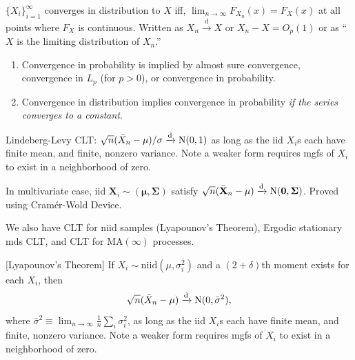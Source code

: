 \documentclass[8pt,letterpaper, landscape]{extarticle} %
\newcommand{\mX}{\ensuremath{\mathbf{X}}}
\newcommand{\mmu}{\ensuremath{\mathbf{\mu}}}
\newcommand{\mSigma}{\ensuremath{\mathbf{\Sigma}}}
\newcommand{\mzero}{\ensuremath{\mathbf{0}}}
\begin{document}
\begin{multicols}{3}
\begin{description}
 $ \{ X_i \}_{i=1}^{\infty} $ converges in distribution to $ X $ iff, $ \lim_{n \to \infty} F_{X_n} (x) = F_X (x) $ at all points where $ F_X $ is continuous. Written as $ X_n \xrightarrow{\text{d}} X $ or $ X_n - X = O_p (1) $ or as ``$ X $ is the limiting distribution of $ X_n $.''
\begin{enumerate}
\item Convergence in probability is implied by almost sure convergence, convergence in $ L_p $ (for $ p>0 $), or convergence in probability.
\item Convergence in distribution implies convergence in probability \textit{if the series converges to a constant}.
\end{enumerate}

 Lindeberg-Levy CLT: $ \sqrt{n} (\bar{X}_n - \mu ) / \sigma \xrightarrow{\text{d}} \operatorname{N} (0,1) $ as long as the iid $ X_i $s each have finite mean, and finite, nonzero variance. Note a weaker form requires mgfs of $ X_i $ to exist in a neighborhood of zero.

In multivariate case, iid $ \mX_i \sim (\mmu, \mSigma) $ satisfy $ \sqrt{n} (\bar{\mX}_n - \mmu ) \xrightarrow{\text{d}} \n (\mzero, \mSigma) $. Proved using Cram\'{e}r-Wold Device.


We also have CLT for niid samples (Lyapounov's Theorem), Ergodic stationary mds CLT, and CLT for $ \text{MA} (\infty) $ processes.

 [Lyapounov's Theorem] If $ X_i \sim \text{niid} (\mu , \sigma_i^2) $ and a $ (2 + \delta ) $th moment exists for each $ X_i $, then
$$ \sqrt{n} ( \bar{X}_n - \mu ) \xrightarrow{\text{d}} \operatorname{N} (0 , \bar{\sigma}^{2} ), $$
where $ \bar{\sigma}^{2} \equiv \lim_{n \to \infty} \tfrac{1}{n} \sum_{i} \sigma_{i}^{2} $, as long as the iid $ X_i $s each have finite mean, and finite, nonzero variance. Note a weaker form requires mgfs of $ X_i $ to exist in a neighborhood of zero.


\end{description}
\end{multicols}
\end{document}
